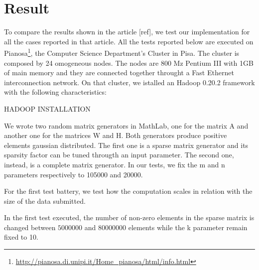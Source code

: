 \section{Result}

To compare the results shown in the article [ref], we test our implementation for all the cases reported in that article. All the tests reported below are executed on Pianosa\footnote{\url{http://pianosa.di.unipi.it/Home_pianosa/html/info.html}}, the Computer Science Department's Cluster in Pisa. The cluster is composed by 24 omogeneous nodes. The nodes are 800 Mz Pentium III with 1GB of main memory and they are connected together throught a Fast Ethernet interconnection network. On that cluster, we istalled an Hadoop 0.20.2 framework with the following characteristics:

\begin{itemize}
\end{itemize}
HADOOP INSTALLATION




We wrote two random matrix generators in MathLab, one for the matrix A and another one for the matrices W and H. Both generators produce positive elements gaussian distributed. The first one is a sparse matrix generator and its sparsity factor can be tuned througth an input parameter. The second one, instead, is a complete matrix generator. In our tests, we fix the m and n parameters respectively to 105000 and 20000.

For the first test battery, we test how the computation scales in relation with the size of the data submitted. 

In the first test executed, the number of non-zero elements in the sparse matrix is changed between $5000000$ and $80000000$ elements while the k parameter remain fixed to 10. 


